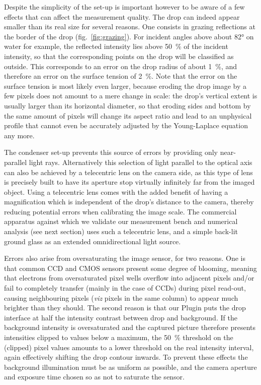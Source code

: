 \documentclass[fleqn]{scrartcl}
\begin{document}
Despite the simplicity of the set-up is important however to be aware
of a few effects that can affect the measurement quality. The drop can
indeed appear smaller than its real size for several reasons. One
consists in grazing reflections at the border of the drop
(fig.~\ref{fig:grazing}). For incident angles above about \ang{82} on
water for example, the reflected intensity lies above
\SI{50}{\percent} of the incident intensity, so that the corresponding
points on the drop will be classified as outside. This corresponds to
an error on the drop radius of about \SI{1}{\percent}, and therefore
an error on the surface tension of \SI{2}{\percent}. Note that the
error on the surface tension is most likely even larger, because
eroding the drop image by a few pixels does not amount to a mere
change in scale: the drop's vertical extent is usually larger than its
horizontal diameter, so that eroding sides and bottom by the same
amount of pixels will change its aspect ratio and lead to an
unphysical profile that cannot even be accurately adjusted by the
Young-Laplace equation any more.

The condenser set-up prevents this source of errors by providing only
near-parallel light rays. Alternatively this selection of light
parallel to the optical axis can also be achieved by a telecentric
lens on the camera side, as this type of lens is precisely built to
have its aperture stop virtually infinitely far from the imaged
object. Using a telecentric lens comes with the added benefit of
having a magnification which is independent of the drop's distance to
the camera, thereby reducing potential errors when calibrating the
image scale. The commercial apparatus against which we validate our
measurement bench and numerical analysis (see next section) uses such
a telecentric lens, and a simple back-lit ground glass as an extended
omnidirectional light source.

Errors also arise from oversaturating the image sensor, for two
reasons. One is that common CCD and CMOS sensors present some degree
of blooming, meaning that electrons from oversaturated pixel wells
overflow into adjacent pixels and/or fail to completely transfer
(mainly in the case of CCDs) during pixel read-out, causing
neighbouring pixels (\textit{viz} pixels in the same column) to appear
much brighter than they should. The second reason is that our Plugin
puts the drop interface at half the intensity contrast between drop
and background. If the background intensity is oversaturated and the
captured picture therefore presents intensities clipped to values
below a maximum, the \SI{50}{\percent} threshold on the (clipped)
pixel values amounts to a lower threshold on the real intensity
interval, again effectively shifting the drop contour inwards. To
prevent these effects the background illumination must be as uniform
as possible, and the camera aperture and exposure time chosen so as
not to saturate the sensor.
\end{document}
